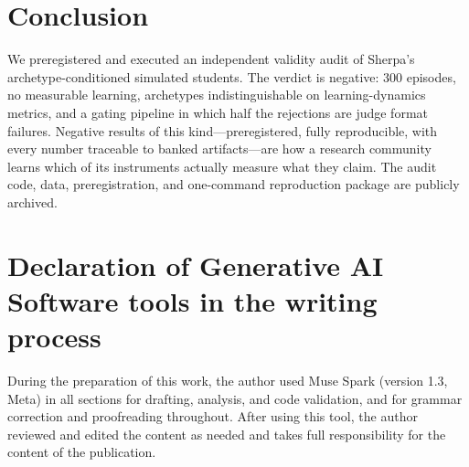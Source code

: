 \documentclass[12pt,a4paper]{article}
\begin{document}
\section{Conclusion}
\label{sec:conclusion}

We preregistered and executed an independent validity audit of Sherpa's
archetype-conditioned simulated students. The verdict is negative: 300
episodes, no measurable learning, archetypes indistinguishable on
learning-dynamics metrics, and a
gating pipeline in which half the rejections are judge format failures.
Negative results of this kind---preregistered, fully reproducible, with
every number traceable to banked artifacts---are how a research community
learns which of its instruments actually measure what they claim. The audit
code, data, preregistration, and one-command reproduction package are
publicly archived.

\section*{Declaration of Generative AI Software tools in the writing process}

During the preparation of this work, the author used Muse Spark (version
1.3, Meta) in all sections for drafting, analysis, and code validation,
and for grammar correction and proofreading throughout. After using this
tool, the author reviewed and edited the content as needed and takes full
responsibility for the content of the publication.
\end{document}
